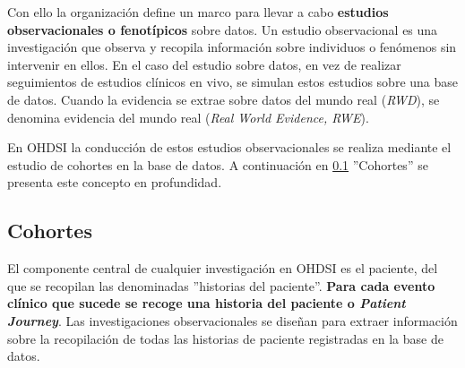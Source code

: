 
Con ello la organización define un marco para llevar a cabo \textbf{estudios observacionales o fenotípicos} sobre datos. Un estudio observacional es una investigación que observa y recopila información sobre individuos o fenómenos sin intervenir en ellos.
En el caso del estudio sobre datos, en vez de realizar seguimientos de estudios clínicos en vivo, se simulan estos estudios sobre una base de datos. Cuando la evidencia se extrae sobre datos del mundo real (\textit{RWD}), se denomina evidencia del mundo real (\textit{Real World Evidence, RWE}). 

En OHDSI la conducción de estos estudios observacionales se realiza mediante el estudio de cohortes en la base de datos. A continuación en \ref{subsec:05cohortes} ''Cohortes'' se presenta este concepto en profundidad.



\subsection{Cohortes} \label{subsec:05cohortes}


El componente central de cualquier investigación en OHDSI es el paciente, del que se recopilan las denominadas ''historias del paciente''. \textbf{Para cada evento clínico que sucede se recoge una historia del paciente o \textit{Patient Journey}}. %
Las investigaciones observacionales se diseñan para extraer información sobre la recopilación de todas las historias de paciente registradas en la base de datos.

